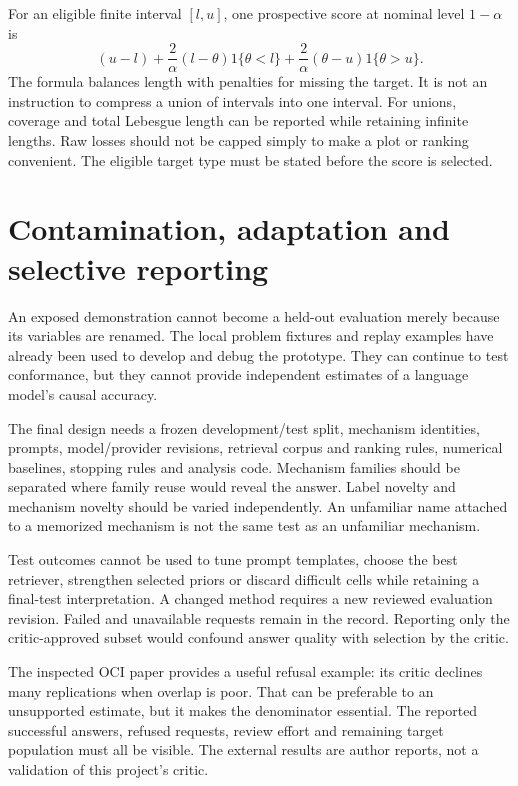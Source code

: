 For an eligible finite interval \([l,u]\), one prospective score at nominal
level \(1-\alpha\) is
\[
 (u-l)+\frac{2}{\alpha}(l-\theta)1\{\theta<l\}
       +\frac{2}{\alpha}(\theta-u)1\{\theta>u\}.
\]
The formula balances length with penalties for missing the target. It is
not an instruction to compress a union of intervals into one interval. For
unions, coverage and total Lebesgue length can be reported while retaining
infinite lengths. Raw losses should not be capped simply to make a plot or
ranking convenient. The eligible target type must be stated before the
score is selected.

\section{Contamination, adaptation and selective reporting}

An exposed demonstration cannot become a held-out evaluation merely because
its variables are renamed. The local problem fixtures and replay examples
have already been used to develop and debug the prototype. They can continue
to test conformance, but they cannot provide independent estimates of a
language model's causal accuracy.

The final design needs a frozen development/test split, mechanism identities,
prompts, model/provider revisions, retrieval corpus and ranking rules, numerical
baselines, stopping rules and analysis code. Mechanism families should be
separated where family reuse would reveal the answer. Label novelty and
mechanism novelty should be varied independently. An unfamiliar name attached
to a memorized mechanism is not the same test as an unfamiliar mechanism.

Test outcomes cannot be used to tune prompt templates, choose the best
retriever, strengthen selected priors or discard difficult cells while
retaining a final-test interpretation. A changed method requires a new
reviewed evaluation revision. Failed and unavailable requests remain in the
record. Reporting only the critic-approved subset would confound answer
quality with selection by the critic.

The inspected OCI paper provides a useful refusal example: its critic
declines many replications when overlap is poor. That can be preferable
to an unsupported estimate, but it makes the denominator essential.
The reported successful answers, refused requests, review effort and
remaining target population must all be visible. The external results
are author reports, not a validation of this project's critic.
\cite{v12_la_2607_22443}

